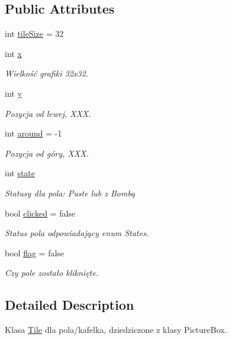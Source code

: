 \subsection*{Public Attributes}
\begin{DoxyCompactItemize}
\item 
int \mbox{\hyperlink{class_saper_1_1_tile_af14b4a73e2ea580fe25cf29eba901f83}{tile\+Size}} = 32
\item 
int \mbox{\hyperlink{class_saper_1_1_tile_a8861f08f0232b9e06b35f9539f97614e}{x}}
\begin{DoxyCompactList}\small\item\em Wielkość grafiki 32x32. \end{DoxyCompactList}\item 
int \mbox{\hyperlink{class_saper_1_1_tile_a4bee1eb877052349f14938b9d28eea87}{y}}
\begin{DoxyCompactList}\small\item\em Pozycja od lewej, X\+XX. \end{DoxyCompactList}\item 
int \mbox{\hyperlink{class_saper_1_1_tile_a049847b44328392d75c1e04276417191}{around}} = -\/1
\begin{DoxyCompactList}\small\item\em Pozycja od góry, X\+XX. \end{DoxyCompactList}\item 
int \mbox{\hyperlink{class_saper_1_1_tile_a59c61b4cd8fc0665533989c017b23688}{state}}
\begin{DoxyCompactList}\small\item\em Statusy dla pola\+: Puste lub z Bombą \end{DoxyCompactList}\item 
bool \mbox{\hyperlink{class_saper_1_1_tile_a0b3e70fcbb158d0d48856f4f1c21e74c}{clicked}} = false
\begin{DoxyCompactList}\small\item\em Status pola odpowiadający enum States. \end{DoxyCompactList}\item 
bool \mbox{\hyperlink{class_saper_1_1_tile_a558d8534615ae6ddcbdbef636b0b7d16}{flag}} = false
\begin{DoxyCompactList}\small\item\em Czy pole zostało kliknięte. \end{DoxyCompactList}\end{DoxyCompactItemize}


\subsection{Detailed Description}
Klasa \mbox{\hyperlink{class_saper_1_1_tile}{Tile}} dla pola/kafelka, dziedziczone z klasy Picture\+Box. 

